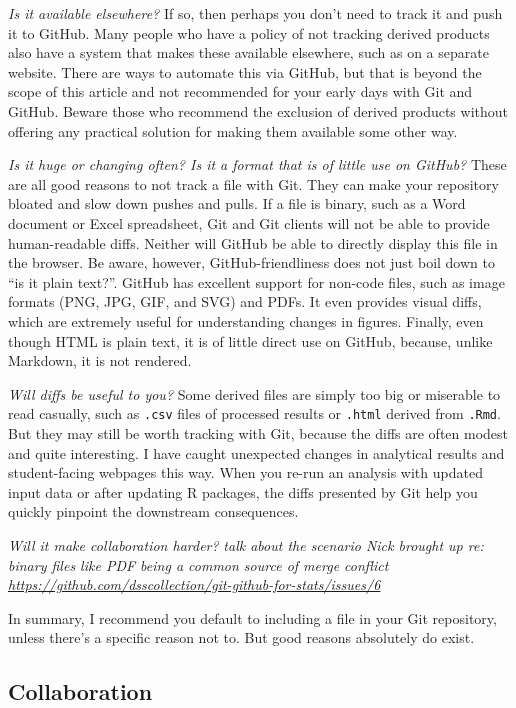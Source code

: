 \documentclass[12pt]{article}
\begin{document}
\emph{Is it available elsewhere?} If so, then perhaps you don't need to
track it and push it to GitHub. Many people who have a policy of not
tracking derived products also have a system that makes these available
elsewhere, such as on a separate website. There are ways to automate
this via GitHub, but that is beyond the scope of this article and not
recommended for your early days with Git and GitHub. Beware those who
recommend the exclusion of derived products without offering any
practical solution for making them available some other way.

\emph{Is it huge or changing often? Is it a format that is of little use
on GitHub?} These are all good reasons to not track a file with Git.
They can make your repository bloated and slow down pushes and pulls. If
a file is binary, such as a Word document or Excel spreadsheet, Git and
Git clients will not be able to provide human-readable diffs. Neither
will GitHub be able to directly display this file in the browser. Be
aware, however, GitHub-friendliness does not just boil down to ``is it
plain text?''. GitHub has excellent support for non-code files, such as
image formats (PNG, JPG, GIF, and SVG) and PDFs. It even provides visual
diffs, which are extremely useful for understanding changes in figures.
Finally, even though HTML is plain text, it is of little direct use on
GitHub, because, unlike Markdown, it is not rendered.

\emph{Will diffs be useful to you?} Some derived files are simply too
big or miserable to read casually, such as \texttt{.csv} files of
processed results or \texttt{.html} derived from \texttt{.Rmd}. But they
may still be worth tracking with Git, because the diffs are often modest
and quite interesting. I have caught unexpected changes in analytical
results and student-facing webpages this way. When you re-run an
analysis with updated input data or after updating R packages, the diffs
presented by Git help you quickly pinpoint the downstream consequences.

\emph{Will it make collaboration harder?} \emph{talk about the scenario
Nick brought up re: binary files like PDF being a common source of merge
conflict
\url{https://github.com/dsscollection/git-github-for-stats/issues/6}}

In summary, I recommend you default to including a file in your Git
repository, unless there's a specific reason not to. But good reasons
absolutely do exist.

\subsection{Collaboration}\label{collaboration}
\end{document}
